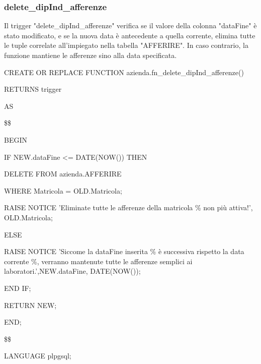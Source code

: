         \subsubsection{delete\_dipInd\_afferenze}
        Il trigger "delete\_dipInd\_afferenze" verifica se il valore della colonna "dataFine" è stato modificato, e se la nuova data è antecedente a quella corrente, elimina tutte le tuple correlate all'impiegato nella tabella "AFFERIRE". In caso contrario, la funzione mantiene le afferenze sino alla data specificata.
        \ttfamily
            \begin{flushleft}
                \begin{description}
                    \item CREATE OR REPLACE FUNCTION azienda.fn\_delete\_dipInd\_afferenze()  
                    \item RETURNS trigger
                    \item AS
                    \item \$\$
                    \item BEGIN 
                    \begin{description}
                        \item IF NEW.dataFine <= DATE(NOW()) THEN
                        \begin{description}
                            \item DELETE FROM azienda.AFFERIRE
                            \item WHERE Matricola = OLD.Matricola;
                    
                            \item RAISE NOTICE 'Eliminate tutte le afferenze della matricola \% non più attiva!', OLD.Matricola;
                        \end{description}

                        \item ELSE
                        \begin{description}
                            \item RAISE NOTICE 'Siccome la dataFine inserita \% è successiva rispetto la data corrente \%, verranno mantenute tutte le afferenze semplici ai laboratori.',NEW.dataFine, DATE(NOW());
                        \end{description}

                        \item END IF;
                        \item RETURN NEW;
                    \end{description}
                    \item END;
                    \item \$\$
                    \item LANGUAGE plpgsql;
                \end{description}
            \end{flushleft}
        \normalfont

